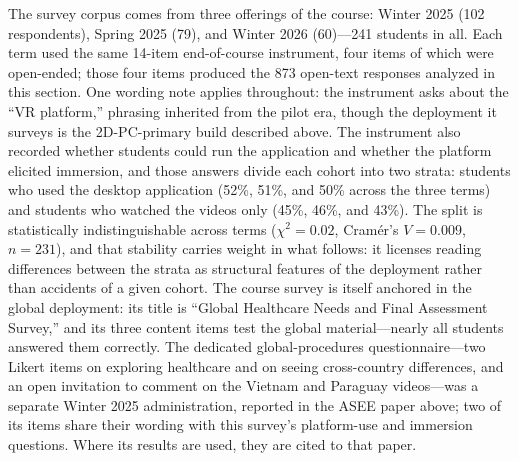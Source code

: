 The survey corpus comes from three offerings of the course: Winter 2025 (102
respondents), Spring 2025 (79), and Winter 2026 (60)---241 students in all.
Each term used the same 14-item end-of-course instrument, four items of which
were open-ended; those four items produced the 873 open-text responses analyzed
in this section. One wording note applies throughout: the instrument asks about
the ``VR platform,'' phrasing inherited from the pilot era, though the
deployment it surveys is the 2D-PC-primary build described above. The
instrument also recorded whether students could run the application and whether
the platform elicited immersion, and those answers divide each cohort into two
strata: students who used the desktop application (52\%, 51\%, and 50\% across
the three terms) and students who watched the videos only (45\%, 46\%, and
43\%). The split is statistically indistinguishable across terms
($\chi^2 = 0.02$, Cram\'er's $V = 0.009$, $n = 231$), and that stability
carries weight in what follows: it licenses reading differences between the
strata as structural features of the deployment rather than accidents of a
given cohort. The course survey is itself anchored in the global deployment:
its title is ``Global Healthcare Needs and Final Assessment Survey,'' and its
three content items test the global material---nearly all students answered
them correctly. The dedicated global-procedures questionnaire---two Likert
items on exploring healthcare and on seeing cross-country differences, and an
open invitation to comment on the Vietnam and Paraguay videos---was a separate
Winter 2025 administration, reported in the ASEE paper above; two of its items
share their wording with this survey's platform-use and immersion questions.
Where its results are used, they are cited to that paper.

